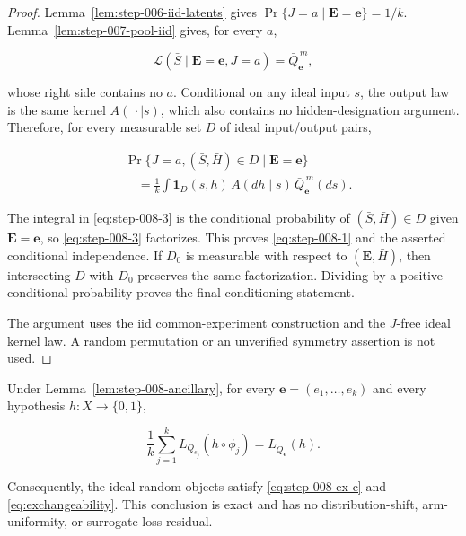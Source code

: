 \begin{proof}

Lemma~\ref{lem:step-006-iid-latents} gives
\(\Pr\{J=a\mid\mathbf E=\mathbf e\}=1/k\).  
Lemma~\ref{lem:step-007-pool-iid} gives, for every \(a\),

\[
\mathcal L(\bar S\mid\mathbf E=\mathbf e,J=a)
=\bar Q_{\mathbf e}^{\,m},
\tag{2}\label{eq:step-008-2}
\]

whose right side contains no \(a\).  Conditional on any ideal input
\(s\), the output law is the same kernel \(A(\,\cdot\mid s)\), which
also contains no hidden-designation argument.  Therefore, for every
measurable set \(D\) of ideal input/output pairs,

\[
\begin{aligned}
&\Pr\{J=a,(\bar S,\bar H)\in D\mid\mathbf E=\mathbf e\}\\
&\quad=\frac1k
\int \mathbf1_D(s,h)
\,A(dh\mid s)\,\bar Q_{\mathbf e}^{\,m}(ds).
\end{aligned}
\tag{3}\label{eq:step-008-3}
\]

The integral in \eqref{eq:step-008-3} is the conditional probability of
\((\bar S,\bar H)\in D\) given \(\mathbf E=\mathbf e\), so \eqref{eq:step-008-3}
factorizes.  This proves \eqref{eq:step-008-1} and the asserted conditional independence.
If \(D_0\) is measurable with respect to \((\mathbf E,\bar H)\), then
intersecting \(D\) with \(D_0\) preserves the same factorization.
Dividing by a positive conditional probability proves the final
conditioning statement.

The argument uses the iid common-experiment construction and the
\(J\)-free ideal kernel law.  A random permutation or an unverified
symmetry assertion is not used.

\end{proof}


\begin{proposition}
\label{prop:step-008-exchangeability}

Under Lemma~\ref{lem:step-008-ancillary}, for every
\(\mathbf e=(e_1,\ldots,e_k)\) and every hypothesis
\(h:X\to\{0,1\}\),

\[
\frac1k\sum_{j=1}^k
L_{Q_{e_j}}(h\circ\phi_j)
=L_{\bar Q_{\mathbf e}}(h).
\tag{4}\label{eq:step-008-4}
\]

Consequently, the ideal random objects satisfy \eqref{eq:step-008-ex-c} and \eqref{eq:exchangeability}.
This conclusion is exact and has no distribution-shift, arm-uniformity,
or surrogate-loss residual.

\end{proposition}

